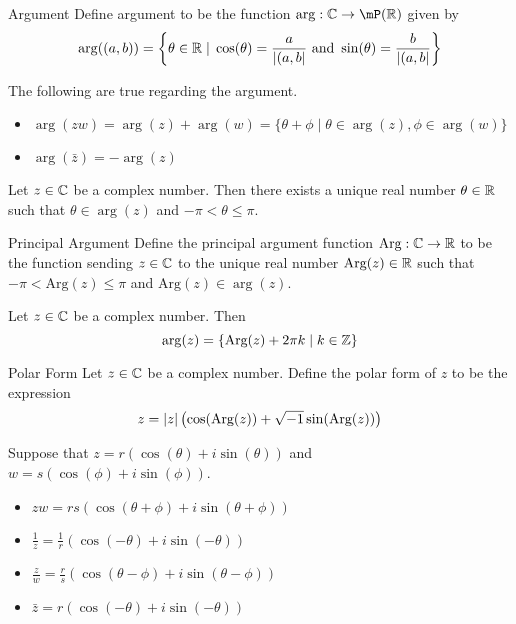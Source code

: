 \documentclass[a4paper]{article}
\begin{document}
\begin{defn}{Argument}{} Define argument to be the function $\arg:\C\to\mP(\R)$ given by $$\arg((a,b))=\left\{\theta\in\mathbb{R}\;|\;\cos(\theta)=\frac{a}{\abs{(a,b}}\text{ and }\sin(\theta)=\frac{b}{\abs{(a,b}}\right\}$$
\end{defn}

\begin{prp}{}{} The following are true regarding the argument. 
\begin{itemize}
\item $\arg{(zw)}=\arg{(z)}+\arg{(w)}=\{\theta+\phi\;|\;\theta\in\arg(z), \phi\in\arg(w)\}$
\item $\arg{(\bar{z})}=-\arg{(z)}$
\end{itemize}
\end{prp}

\begin{lmm}{}{} Let $z\in\mathbb{C}$ be a complex number. Then there exists a unique real number $\theta\in\mathbb{R}$ such that $\theta\in\arg(z)$ and $-\pi<\theta\leq\pi$. 
\end{lmm}

\begin{defn}{Principal Argument}{} Define the principal argument function $\text{Arg}:\mathbb{C}\to\mathbb{R}$ to be the function sending $z\in\mathbb{C}$ to the unique real number $\text{Arg}(z)\in\mathbb{R}$ such that $-\pi<\text{Arg}(z)\leq\pi$ and $\text{Arg}(z)\in\arg(z)$. 
\end{defn}

\begin{lmm}{}{} Let $z\in\mathbb{C}$ be a complex number. Then $$\arg(z)=\{\text{Arg}(z)+2\pi k\;|\;k\in\mathbb{Z}\}$$
\end{lmm}

\begin{defn}{Polar Form}{} Let $z\in\mathbb{C}$ be a complex number. Define the polar form of $z$ to be the expression $$z=\abs{z}\left(\cos(\text{Arg}(z))+\sqrt{-1}\sin(\text{Arg}(z))\right)$$
\end{defn}

\begin{prp}{}{} Suppose that $z=r(\cos{(\theta)}+i\sin{(\theta)})$ and $w=s(\cos{(\phi)}+i\sin{(\phi)})$. 
\begin{itemize}
\item $zw=rs(\cos{(\theta+\phi)}+i\sin{(\theta+\phi)})$
\item $\frac{1}{z}=\frac{1}{r}(\cos{(-\theta)}+i\sin{(-\theta)})$
\item $\frac{z}{w}=\frac{r}{s}(\cos{(\theta-\phi)}+i\sin{(\theta-\phi)})$
\item $\bar{z}=r(\cos{(-\theta)}+i\sin{(-\theta)})$
\end{itemize}
\end{prp}
\end{document}
